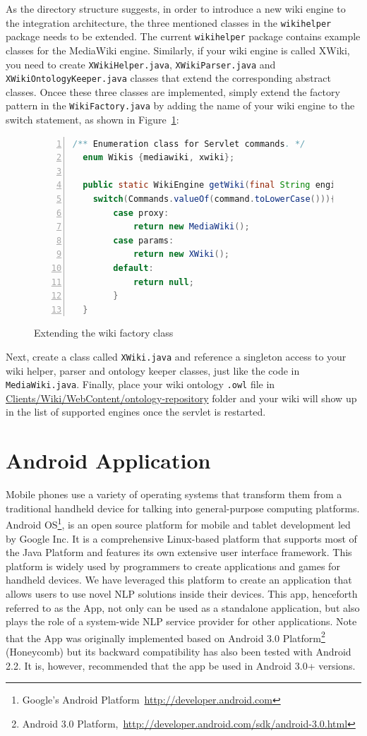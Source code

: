 As the directory structure suggests, in order to introduce a new wiki engine to the integration architecture, the three mentioned classes in the \texttt{wikihelper} package needs to be extended. The current \texttt{wikihelper} package contains example classes for the MediaWiki engine. Similarly, if your wiki engine is called XWiki, you need to create \texttt{XWikiHelper.java}, \texttt{XWikiParser.java} and \texttt{XWikiOntologyKeeper.java} classes that extend the corresponding abstract classes. Oncee these three classes are implemented, simply extend the factory pattern in the \texttt{WikiFactory.java} by adding the name of your wiki engine to the switch statement, as shown in Figure~\ref{list:wiki_factory_extend}:

\begin{figure}[h!]
\centering
\begin{lstlisting}[language=Java,numbers=left,xleftmargin=4mm,columns=flexible]
  /** Enumeration class for Servlet commands. */
  enum Wikis {mediawiki, xwiki};

  public static WikiEngine getWiki(final String engine){
    switch(Commands.valueOf(command.toLowerCase())){
		case proxy:
			return new MediaWiki();
		case params:
			return new XWiki();
		default:
			return null;
		}
  }
\end{lstlisting}
\caption{Extending the wiki factory class}
\label{list:wiki_factory_extend}
\end{figure}

Next, create a class called \texttt{XWiki.java} and reference a singleton access to your wiki helper, parser and ontology keeper classes, just like the code in \texttt{MediaWiki.java}. Finally, place your wiki ontology \texttt{.owl} file in \url{Clients/Wiki/WebContent/ontology-repository} folder and your wiki will show up in the list of supported engines once the servlet is restarted.

\section{Android Application}
Mobile phones use a variety of operating systems that transform them from a traditional handheld device for talking into general-purpose computing platforms. Android OS\footnote{Google's Android Platform~\url{http://developer.android.com}}, is an open source platform for mobile and tablet development led by Google Inc. It is a comprehensive Linux-based platform that supports most of the Java Platform and features its own extensive user interface framework. This platform is widely used by programmers to create applications and games for handheld devices. We have leveraged this platform to create an application that allows users to use novel NLP solutions inside their devices. This app, henceforth referred to as the \sa App, not only can be used as a standalone application, but also plays the role of a system-wide NLP service provider for other applications. Note that the \sa App was originally implemented based on Android 3.0 Platform\footnote{Android 3.0 Platform,~\url{http://developer.android.com/sdk/android-3.0.html}} (Honeycomb) but its backward compatibility has also been tested with Android 2.2. It is, however, recommended that the app be used in Android 3.0+ versions.

